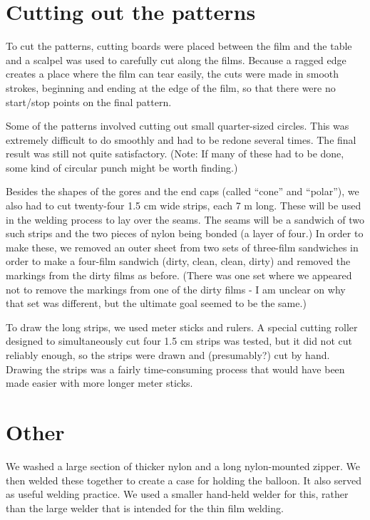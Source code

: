 \documentclass{article}
\begin{document}
\section{Cutting out the patterns}
To cut the patterns, cutting boards were placed between the film and the table and a scalpel was used to carefully cut along the films. Because a ragged edge creates a place where the film can tear easily, the cuts were made in smooth strokes, beginning and ending at the edge of the film, so that there were no start/stop points on the final pattern. %

Some of the patterns involved cutting out small quarter-sized circles. This was extremely difficult to do smoothly and had to be redone several times. The final result was still not quite satisfactory. (Note: If many of these had to be done, some kind of circular punch might be worth finding.) 

Besides the shapes of the gores and the end caps (called ``cone'' and ``polar''), we also had to cut twenty-four 1.5 cm wide strips, each 7 m long. These will be used in the welding process to lay over the seams. The seams will be a sandwich of two such strips and the two pieces of nylon being bonded (a layer of four.) 
In order to make these, we removed an outer sheet from two sets of three-film sandwiches in order to make a four-film sandwich (dirty, clean, clean, dirty) and removed the markings from the dirty films as before.  (There was one set where we appeared not to remove the markings from one of the dirty films - I am unclear on why that set was different, but the ultimate goal seemed to be the same.) 

To draw the long strips, we used meter sticks and rulers. A special cutting roller designed to simultaneously cut four 1.5 cm strips was tested, but it did not cut reliably enough, so the strips were drawn and (presumably?) cut by hand.  Drawing the strips was a fairly time-consuming process that would have been made easier with more longer meter sticks. 


\section{Other}
We washed a large section of thicker nylon and a long nylon-mounted zipper. We then welded these together to create a case for holding the balloon. It also served as useful welding practice. We used a smaller hand-held welder for this, rather than the large welder that is intended for the thin film welding. 
\end{document}
